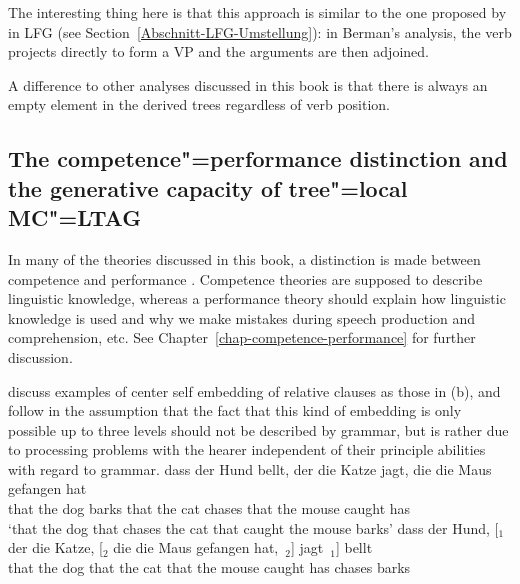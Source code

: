 The interesting thing here is that this approach is similar to the one proposed by \citet[Section~2.1.3]{Berman96a-u} in LFG\indexlfg
(see Section~\ref{Abschnitt-LFG-Umstellung}): in Berman's analysis, the verb projects directly to form a VP and the arguments are
then adjoined. 

A difference to other analyses discussed in this book is that there is always an empty
element in the derived trees regardless
of verb position.%

\subsection{The competence"=performance distinction and the generative capacity of tree"=local MC"=LTAG}
\label{Abschnitt-Kompetenz-Performanz-TAG}

In many of the theories discussed in this book, a distinction is made between competence and performance
\citep[Section~I.1]{Chomsky65a}. Competence theories are supposed to describe linguistic knowledge, whereas a performance theory should
explain how linguistic knowledge is used and why we make mistakes during speech production and
comprehension, etc. See Chapter~\ref{chap-competence-performance} for further discussion.

\citet*{JBR2000a} discuss examples of center self embedding of relative clauses as those in (b),
and follow \citet[]{CM63a}  in the assumption that the fact that this kind of embedding is only possible up to three levels should not be
described by grammar, but is rather due to processing problems with the hearer independent of their principle abilities with regard to grammar.
\eal
\label{TAG-Beispiel-Performanz}
\ex 
\gll dass der Hund bellt, der  die Katze jagt,  die  die Maus  gefangen hat\\
     that the dog  barks  that the cat   chases that the mouse caught   has\\
\glt `that the dog that chases the cat that caught the mouse barks'
\ex 
\gll dass der Hund, [$_1$ der  die Katze, [$_2$ die  die Maus  gefangen hat,~$_2$] jagt~$_1$] bellt\\
     that the dog   {}    that the cat    {}    that the mouse caught   has        chases    barks\\
\zl

